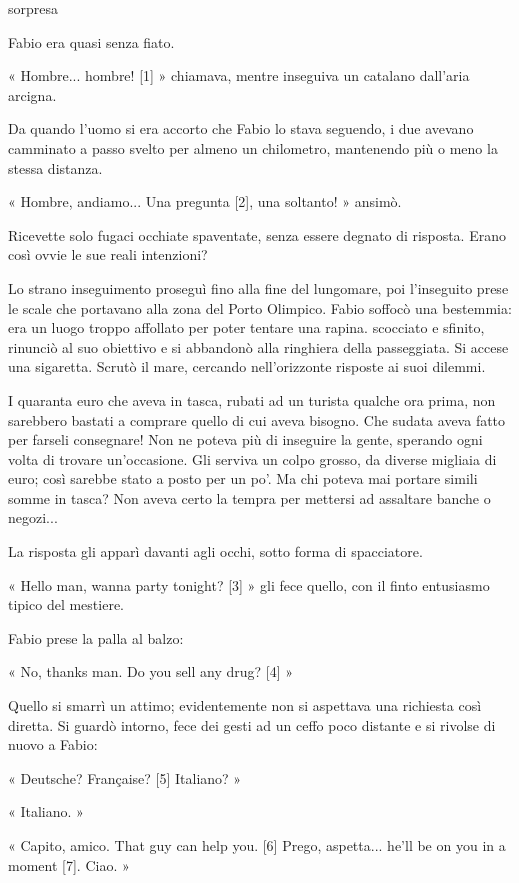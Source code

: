 sorpresa


 Fabio era quasi senza fiato.

« Hombre... hombre! [1] » chiamava, mentre inseguiva un catalano dall'aria arcigna. 

Da quando l'uomo si era accorto che Fabio lo stava seguendo, i due avevano camminato a passo svelto per almeno un chilometro, mantenendo più o meno la stessa distanza.

« Hombre, andiamo... Una pregunta [2], una soltanto! » ansimò. 

Ricevette solo fugaci occhiate spaventate, senza essere degnato di risposta. Erano così ovvie le sue reali intenzioni?

Lo strano inseguimento proseguì fino alla fine del lungomare, poi l'inseguito prese le scale che portavano alla zona del Porto Olimpico. Fabio soffocò una bestemmia: era un luogo troppo affollato per poter tentare una rapina. scocciato e sfinito, rinunciò al suo obiettivo e si abbandonò alla ringhiera della passeggiata. Si accese una sigaretta. Scrutò il mare, cercando nell'orizzonte risposte ai suoi dilemmi.

I quaranta euro che aveva in tasca, rubati ad un turista qualche ora prima, non sarebbero bastati a comprare quello di cui aveva bisogno. Che sudata aveva fatto per farseli consegnare! Non ne poteva più di inseguire la gente, sperando ogni volta di trovare un'occasione. Gli serviva un colpo grosso, da diverse migliaia di euro; così sarebbe stato a posto per un po'. Ma chi poteva mai portare simili somme in tasca? Non aveva certo la tempra per mettersi ad assaltare banche o negozi...

La risposta gli apparì davanti agli occhi, sotto forma di spacciatore.

« Hello man, wanna party tonight? [3] » gli fece quello, con il finto entusiasmo tipico del mestiere.

Fabio prese la palla al balzo:

« No, thanks man. Do you sell any drug? [4] »

Quello si smarrì un attimo; evidentemente non si aspettava una richiesta così diretta. Si guardò intorno, fece dei gesti ad un ceffo poco distante e si rivolse di nuovo a Fabio:

« Deutsche? Française? [5] Italiano? »

« Italiano. »

« Capito, amico. That guy can help you. [6] Prego, aspetta... he'll be on you in a moment [7]. Ciao. »

